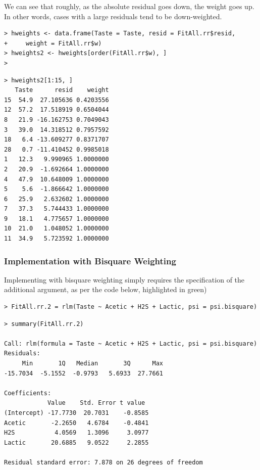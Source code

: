 \documentclass[12pt, a4paper]{article}
\theoremstyle{plain}
\theoremstyle{definition}
\theoremstyle{remark}
\begin{document}
We can see that roughly, as the absolute residual goes down, the weight goes up. In other words, cases with a large residuals tend to be down-weighted.


\begin{framed}
\begin{verbatim}
> hweights <- data.frame(Taste = Taste, resid = FitAll.rr$resid,
+     weight = FitAll.rr$w)
> hweights2 <- hweights[order(FitAll.rr$w), ]
>
\end{verbatim}
\end{framed}

\begin{verbatim}
> hweights2[1:15, ]
   Taste      resid    weight
15  54.9  27.105636 0.4203556
12  57.2  17.518919 0.6504044
8   21.9 -16.162753 0.7049043
3   39.0  14.318512 0.7957592
18   6.4 -13.609277 0.8371707
28   0.7 -11.410452 0.9985018
1   12.3   9.990965 1.0000000
2   20.9  -1.692664 1.0000000
4   47.9  10.648009 1.0000000
5    5.6  -1.866642 1.0000000
6   25.9   2.632602 1.0000000
7   37.3   5.744433 1.0000000
9   18.1   4.775657 1.0000000
10  21.0   1.048052 1.0000000
11  34.9   5.723592 1.0000000
\end{verbatim}
\subsubsection{Implementation with Bisquare Weighting}
Implementing with bisquare weighting simply requires the specification of the additional argument, as per the code below, highlighted in green)
\begin{framed}
\begin{verbatim}
> FitAll.rr.2 = rlm(Taste ~ Acetic + H2S + Lactic, psi = psi.bisquare)
\end{verbatim}
\end{framed}
\begin{verbatim}
> summary(FitAll.rr.2)

Call: rlm(formula = Taste ~ Acetic + H2S + Lactic, psi = psi.bisquare)
Residuals:
     Min       1Q   Median       3Q      Max 
-15.7034  -5.1552  -0.9793   5.6933  27.7661 

Coefficients:
            Value    Std. Error t value 
(Intercept) -17.7730  20.7031    -0.8585
Acetic       -2.2650   4.6784    -0.4841
H2S           4.0569   1.3096     3.0977
Lactic       20.6885   9.0522     2.2855

Residual standard error: 7.878 on 26 degrees of freedom
\end{verbatim}
\end{document}
